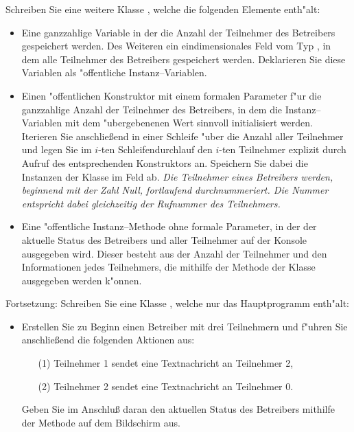 \documentclass[9pt,german]{beamer}%
\begin{document}
\begin{frame}
Schreiben Sie eine weitere Klasse , welche die folgenden
Elemente enth"alt:
\begin{itemize}
\item
Eine ganzzahlige Variable  in der die Anzahl der Teilnehmer
des Betreibers gespeichert werden. Des Weiteren ein eindimensionales Feld
 vom Typ ,
in dem alle Teilnehmer des Betreibers gespeichert werden.
Deklarieren Sie diese Variablen als "offentliche Instanz--Variablen.
\item
Einen "offentlichen Konstruktor mit einem formalen Parameter f"ur die ganzzahlige Anzahl
der Teilnehmer des Betreibers, in dem die Instanz--Variablen mit
dem "ubergebenenen Wert sinnvoll initialisiert werden.
Iterieren Sie anschlie\ss end in einer Schleife "uber die Anzahl aller Teilnehmer und
legen Sie im $i$-ten Schleifendurchlauf den $i$-ten Teilnehmer
explizit durch Aufruf des entsprechenden Konstruktors an. Speichern Sie dabei die Instanzen
der Klasse  im Feld  ab.
\emph{
Die Teilnehmer eines Betreibers werden,
beginnend mit der Zahl Null, fortlaufend durchnummeriert.
Die Nummer entspricht dabei gleichzeitig der Rufnummer
des Teilnehmers.}
\item
Eine "offentliche Instanz--Methode
 ohne formale Parameter, in der der aktuelle Status des Betreibers
und aller Teilnehmer auf der Konsole ausgegeben wird. Dieser besteht aus
der Anzahl der Teilnehmer und den Informationen jedes Teilnehmers, die mithilfe
der  Methode der Klasse  ausgegeben werden k"onnen.
\end{itemize}

\end{frame}

\begin{frame}
Fortsetzung:
Schreiben Sie eine Klasse , welche nur das Hauptprogramm enth"alt:
\begin{itemize}
\item
Erstellen Sie zu Beginn einen Betreiber  mit drei Teilnehmern und f"uhren
Sie anschlie{\ss}end die folgenden Aktionen aus:
\begin{itemize}
\item[(1)]
Teilnehmer 1 sendet eine Textnachricht an Teilnehmer 2,
\item[(2)]
Teilnehmer 2 sendet eine Textnachricht an Teilnehmer 0.
\end{itemize}
Geben Sie im Anschlu{\ss} daran den aktuellen Status des Betreibers
mithilfe der Methode  auf dem Bildschirm aus.
\end{itemize}
\end{frame}



\begin{frame}
\centering
\Huge{}
\end{frame}


\end{document}
